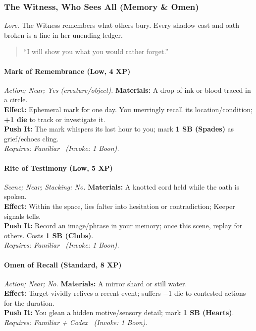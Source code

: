 \subsubsection{The Witness, Who Sees All (Memory \& Omen)}
\textit{Lore.} The Witness remembers what others bury. Every shadow cast and oath broken is a line in her unending ledger.

\begin{quote}
“I will show you what you would rather forget.”
\end{quote}

\paragraph{Mark of Remembrance (Low, 4 XP)} \emph{Action; Near; Yes (creature/object).}
\textbf{Materials:} A drop of ink or blood traced in a circle.\\
\textbf{Effect:} Ephemeral mark for one day. You unerringly recall its location/condition; \textbf{+1 die} to track or investigate it.\\
\textbf{Push It:} The mark whispers its last hour to you; mark \textbf{1 SB (Spades)} as grief/echoes cling.\\
\emph{Requires: Familiar \ (\textit{Invoke:} 1 Boon).}

\paragraph{Rite of Testimony (Low, 5 XP)} \emph{Scene; Near; Stacking: No.}
\textbf{Materials:} A knotted cord held while the oath is spoken.\\
\textbf{Effect:} Within the space, lies falter into hesitation or contradiction; Keeper signals tells.\\
\textbf{Push It:} Record an image/phrase in your memory; once this scene, replay for others. Costs \textbf{1 SB (Clubs)}.\\
\emph{Requires: Familiar \ (\textit{Invoke:} 1 Boon).}

\paragraph{Omen of Recall (Standard, 8 XP)} \emph{Action; Near; No.}
\textbf{Materials:} A mirror shard or still water.\\
\textbf{Effect:} Target vividly relives a recent event; suffers \(-1\) die to contested actions for the duration.\\
\textbf{Push It:} You glean a hidden motive/sensory detail; mark \textbf{1 SB (Hearts)}.\\
\emph{Requires: Familiar + Codex \ (\textit{Invoke:} 1 Boon).}

